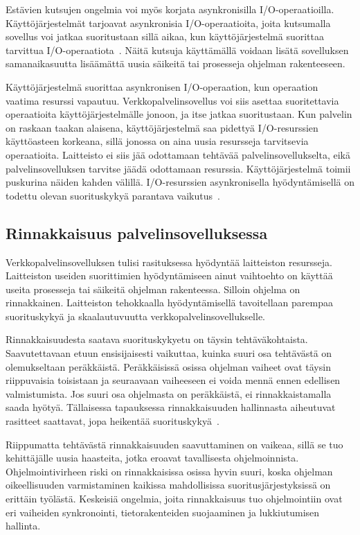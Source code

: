 \documentclass[finnish]{tktltiki2}%
\theoremstyle{definition}
\theoremstyle{remark}
\begin{document}
Estävien kutsujen ongelmia voi myös korjata asynkronisilla I/O-operaatioilla.
Käyttöjärjestelmät tarjoavat asynkronisia I/O-operaatioita, joita kutsumalla
sovellus voi jatkaa suoritustaan sillä aikaa, kun käyttöjärjestelmä
suorittaa tarvittua I/O-operaatiota~\cite{schmidt_reactor:_1995}.
Näitä kutsuja käyttämällä voidaan
lisätä sovelluksen samanaikasuutta lisäämättä uusia säikeitä
tai prosesseja ohjelman rakenteeseen.

Käyttöjärjestelmä suorittaa asynkronisen I/O-operaation,
kun operaation vaatima resurssi vapautuu. Verkkopalvelinsovellus
voi siis asettaa suoritettavia operaatioita käyttöjärjestelmälle
jonoon, ja itse jatkaa suoritustaan. Kun palvelin
on raskaan taakan alaisena, käyttöjärjestelmä saa pidettyä
I/O-resurssien käyttöasteen korkeana, sillä jonossa on aina
uusia resursseja tarvitsevia operaatioita.
Laitteisto ei siis jää odottamaan tehtävää
palvelinsovellukselta, eikä palvelinsovelluksen tarvitse jäädä
odottamaan resurssia. Käyttöjärjestelmä toimii
puskurina näiden kahden välillä.
I/O-resurssien asynkronisella hyödyntämisellä on todettu
olevan suorituskykyä parantava vaikutus~\cite{hu_applying_1998}.

\subsection{Rinnakkaisuus palvelinsovelluksessa}
Verkkopalvelinsovelluksen tulisi rasituksessa hyödyntää 
laitteiston resursseja. Laitteiston useiden suorittimien
hyödyntämiseen ainut vaihtoehto on käyttää
useita prosesseja tai säikeitä ohjelman rakenteessa.
Silloin ohjelma on rinnakkainen.
Laitteiston tehokkaalla hyödyntämisellä
tavoitellaan parempaa 
suorituskykyä ja skaalautuvuutta
verkkopalvelinsovellukselle.

Rinnakkaisuudesta saatava suorituskykyetu on täysin tehtäväkohtaista.
Saavutettavaan etuun ensisijaisesti vaikuttaa, kuinka suuri osa tehtävästä on olemukseltaan peräkkäistä.
Peräkkäisissä osissa ohjelman vaiheet ovat täysin
riippuvaisia toisistaan ja seuraavaan vaiheeseen ei voida mennä ennen edellisen
valmistumista. Jos suuri osa ohjelmasta on peräkkäistä, ei rinnakkaistamalla
saada hyötyä. Tällaisessa tapauksessa rinnakkaisuuden hallinnasta aiheutuvat
rasitteet saattavat, jopa heikentää suorituskykyä~\cite{stallings_operating_2018}.

Riippumatta tehtävästä rinnakkaisuuden saavuttaminen on vaikeaa,
sillä se tuo kehittäjälle uusia haasteita, jotka eroavat tavallisesta
ohjelmoinnista. Ohjelmointivirheen riski on rinnakkaisissa osissa hyvin suuri,
koska ohjelman oikeellisuuden varmistaminen kaikissa mahdollisissa
suoritusjärjestyksissä on erittäin työlästä.
Keskeisiä ongelmia, joita rinnakkaisuus tuo ohjelmointiin ovat eri vaiheiden
synkronointi, tietorakenteiden suojaaminen ja lukkiutumisen hallinta.
\end{document}
